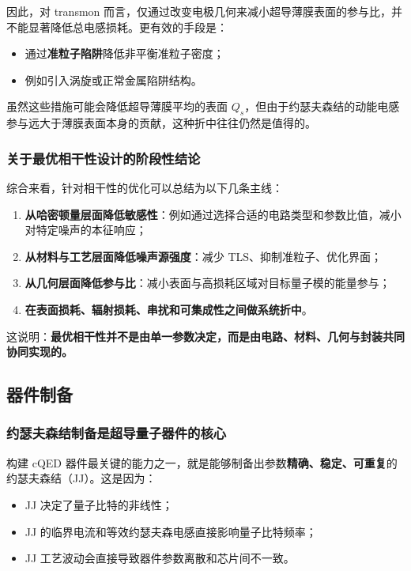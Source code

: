 \documentclass[12pt,a4paper,oneside]{ctexbook}
\begin{document}
因此，对 transmon 而言，仅通过改变电极几何来减小超导薄膜表面的参与比，并不能显著降低总电感损耗。更有效的手段是：
\begin{itemize}
    \item 通过\textbf{准粒子陷阱}降低非平衡准粒子密度；
    \item 例如引入涡旋或正常金属陷阱结构。
\end{itemize}

虽然这些措施可能会降低超导薄膜平均的表面 \(Q_s\)，但由于约瑟夫森结的动能电感参与远大于薄膜表面本身的贡献，这种折中往往仍然是值得的。

\subsubsection{关于最优相干性设计的阶段性结论}

综合来看，针对相干性的优化可以总结为以下几条主线：

\begin{enumerate}
    \item \textbf{从哈密顿量层面降低敏感性}：例如通过选择合适的电路类型和参数比值，减小对特定噪声的本征响应；
    \item \textbf{从材料与工艺层面降低噪声源强度}：减少 TLS、抑制准粒子、优化界面；
    \item \textbf{从几何层面降低参与比}：减小表面与高损耗区域对目标量子模的能量参与；
    \item \textbf{在表面损耗、辐射损耗、串扰和可集成性之间做系统折中}。
\end{enumerate}

这说明：\textbf{最优相干性并不是由单一参数决定，而是由电路、材料、几何与封装共同协同实现的。}

\subsection{器件制备}

\subsubsection{约瑟夫森结制备是超导量子器件的核心}

构建 cQED 器件最关键的能力之一，就是能够制备出参数\textbf{精确、稳定、可重复}的约瑟夫森结（JJ）。这是因为：
\begin{itemize}
    \item JJ 决定了量子比特的非线性；
    \item JJ 的临界电流和等效约瑟夫森电感直接影响量子比特频率；
    \item JJ 工艺波动会直接导致器件参数离散和芯片间不一致。
\end{itemize}
\end{document}
